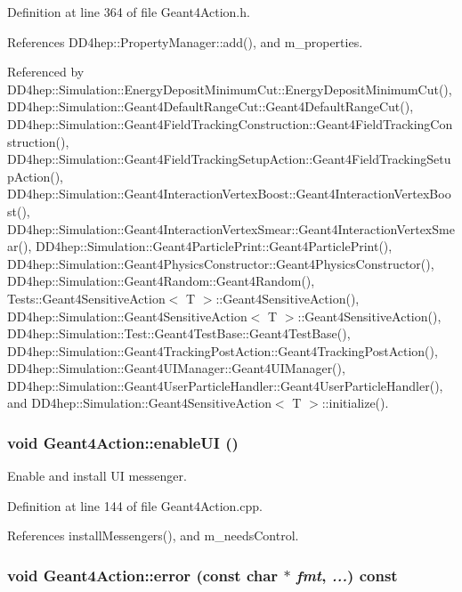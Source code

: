 Definition at line 364 of file Geant4Action.h.

References DD4hep::PropertyManager::add(), and m\_\-properties.

Referenced by DD4hep::Simulation::EnergyDepositMinimumCut::EnergyDepositMinimumCut(), DD4hep::Simulation::Geant4DefaultRangeCut::Geant4DefaultRangeCut(), DD4hep::Simulation::Geant4FieldTrackingConstruction::Geant4FieldTrackingConstruction(), DD4hep::Simulation::Geant4FieldTrackingSetupAction::Geant4FieldTrackingSetupAction(), DD4hep::Simulation::Geant4InteractionVertexBoost::Geant4InteractionVertexBoost(), DD4hep::Simulation::Geant4InteractionVertexSmear::Geant4InteractionVertexSmear(), DD4hep::Simulation::Geant4ParticlePrint::Geant4ParticlePrint(), DD4hep::Simulation::Geant4PhysicsConstructor::Geant4PhysicsConstructor(), DD4hep::Simulation::Geant4Random::Geant4Random(), Tests::Geant4SensitiveAction$<$ T $>$::Geant4SensitiveAction(), DD4hep::Simulation::Geant4SensitiveAction$<$ T $>$::Geant4SensitiveAction(), DD4hep::Simulation::Test::Geant4TestBase::Geant4TestBase(), DD4hep::Simulation::Geant4TrackingPostAction::Geant4TrackingPostAction(), DD4hep::Simulation::Geant4UIManager::Geant4UIManager(), DD4hep::Simulation::Geant4UserParticleHandler::Geant4UserParticleHandler(), and DD4hep::Simulation::Geant4SensitiveAction$<$ T $>$::initialize().\hypertarget{class_d_d4hep_1_1_simulation_1_1_geant4_action_a3cc9526eece0aaceec6b62fa74d8c055}{
\subsubsection[{enableUI}]{\setlength{\rightskip}{0pt plus 5cm}void Geant4Action::enableUI ()}}
\label{class_d_d4hep_1_1_simulation_1_1_geant4_action_a3cc9526eece0aaceec6b62fa74d8c055}


Enable and install UI messenger. 

Definition at line 144 of file Geant4Action.cpp.

References installMessengers(), and m\_\-needsControl.\hypertarget{class_d_d4hep_1_1_simulation_1_1_geant4_action_a2e1c04c087846bf9bf349d26667660a2}{
\subsubsection[{error}]{\setlength{\rightskip}{0pt plus 5cm}void Geant4Action::error (const char $\ast$ {\em fmt}, \/   {\em ...}) const}}
\label{class_d_d4hep_1_1_simulation_1_1_geant4_action_a2e1c04c087846bf9bf349d26667660a2}


